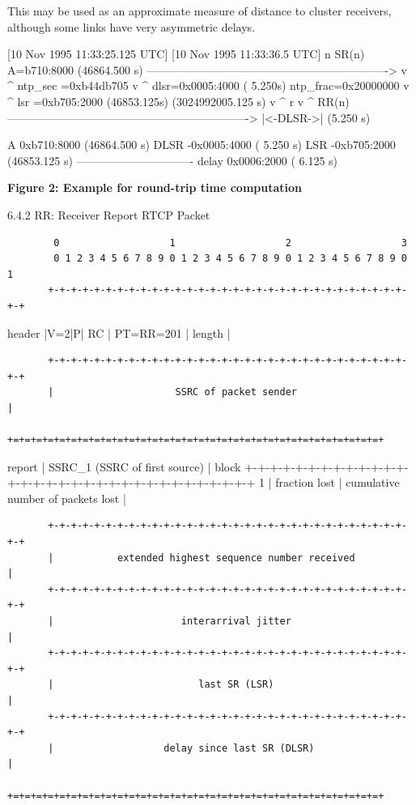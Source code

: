 \documentclass{article}
\begin{document}
This may be used as an approximate measure of distance to cluster receivers, although some links have very asymmetric delays.

[10 Nov 1995 11:33:25.125 UTC]       [10 Nov 1995 11:33:36.5 UTC] n                 SR(n)              A=b710:8000 (46864.500 s) ----------------------------------------------------------------> v                 \textasciicircum{} ntp\_sec =0xb44db705 v               \textasciicircum{} dlsr=0x0005:4000 (    5.250s) ntp\_frac=0x20000000  v             \textasciicircum{}  lsr =0xb705:2000 (46853.125s) (3024992005.125 s)  v           \textasciicircum{} r                      v         \textasciicircum{} RR(n) ----------------------------------------------------------------> |<-DLSR->| (5.250 s)

A     0xb710:8000 (46864.500 s) DLSR -0x0005:4000 (    5.250 s) LSR  -0xb705:2000 (46853.125 s) ------------------------------- delay 0x0006:2000 (    6.125 s)

\begin{center}
\textbf{Figure 2: Example for round-trip time computation}
\end{center}

6.4.2 RR: Receiver Report RTCP Packet

\begin{verbatim}
        0                   1                   2                   3
        0 1 2 3 4 5 6 7 8 9 0 1 2 3 4 5 6 7 8 9 0 1 2 3 4 5 6 7 8 9 0 1
       +-+-+-+-+-+-+-+-+-+-+-+-+-+-+-+-+-+-+-+-+-+-+-+-+-+-+-+-+-+-+-+-+
\end{verbatim}

header |V=2|P|    RC   |   PT=RR=201   |             length            |

\begin{verbatim}
       +-+-+-+-+-+-+-+-+-+-+-+-+-+-+-+-+-+-+-+-+-+-+-+-+-+-+-+-+-+-+-+-+
       |                     SSRC of packet sender                     |
       +=+=+=+=+=+=+=+=+=+=+=+=+=+=+=+=+=+=+=+=+=+=+=+=+=+=+=+=+=+=+=+=+
\end{verbatim}

report |                 SSRC\_1 (SSRC of first source)                 | block  +-+-+-+-+-+-+-+-+-+-+-+-+-+-+-+-+-+-+-+-+-+-+-+-+-+-+-+-+-+-+-+-+ 1    | fraction lost |       cumulative number of packets lost       |

\begin{verbatim}
       +-+-+-+-+-+-+-+-+-+-+-+-+-+-+-+-+-+-+-+-+-+-+-+-+-+-+-+-+-+-+-+-+
       |           extended highest sequence number received           |
       +-+-+-+-+-+-+-+-+-+-+-+-+-+-+-+-+-+-+-+-+-+-+-+-+-+-+-+-+-+-+-+-+
       |                      interarrival jitter                      |
       +-+-+-+-+-+-+-+-+-+-+-+-+-+-+-+-+-+-+-+-+-+-+-+-+-+-+-+-+-+-+-+-+
       |                         last SR (LSR)                         |
       +-+-+-+-+-+-+-+-+-+-+-+-+-+-+-+-+-+-+-+-+-+-+-+-+-+-+-+-+-+-+-+-+
       |                   delay since last SR (DLSR)                  |
       +=+=+=+=+=+=+=+=+=+=+=+=+=+=+=+=+=+=+=+=+=+=+=+=+=+=+=+=+=+=+=+=+
\end{verbatim}
\end{document}
